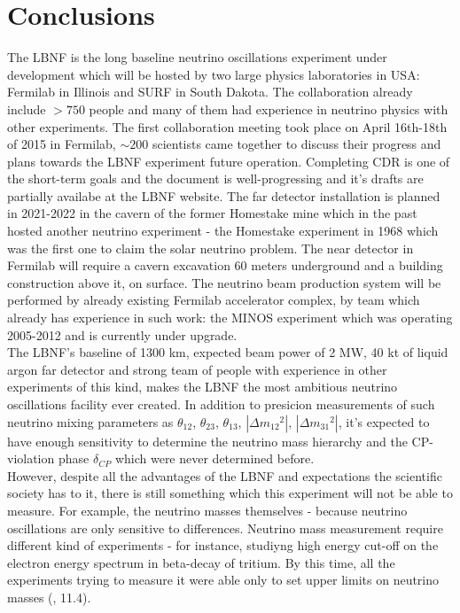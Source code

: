 \section{Conclusions}
The LBNF is the long baseline neutrino oscillations experiment under development which will be hosted by two large physics laboratories in USA: Fermilab in Illinois and SURF in South Dakota. The collaboration already include $>750$ people and many of them had experience in neutrino physics with other experiments. The first collaboration meeting took place on April 16th-18th of 2015 in Fermilab, $\sim 200$ scientists came together to discuss their progress and plans towards the LBNF experiment future operation. Completing CDR is one of the short-term goals and the document is well-progressing and it's drafts are partially availabe at the LBNF website. The far detector installation is planned in 2021-2022 in the cavern of the former Homestake mine which in the past hosted another neutrino experiment - the Homestake experiment in 1968 which was the first one to claim the solar neutrino problem. The near detector in Fermilab will require a cavern excavation 60 meters underground and a building construction above it, on surface. The neutrino beam production system will be performed by already existing Fermilab accelerator complex, by team which already has experience in such work: the MINOS experiment which was operating 2005-2012 and is currently under upgrade.    \\  

The LBNF's baseline of 1300 km, expected beam power of 2 MW, 40 kt of liquid argon far detector and strong team of people with experience in other experiments of this kind, makes the LBNF the most ambitious neutrino oscillations facility ever created. In addition to presicion measurements of such neutrino mixing parameters as $\theta_{12}$, $\theta_{23}$, $\theta_{13}$, $|\Delta{m_{12}}^2|$, $|\Delta{m_{31}}^2|$, it's expected to have enough sensitivity to determine the neutrino mass hierarchy and the CP-violation phase $\delta_{CP}$ which were never determined before.\\

However, despite all the advantages of the LBNF and expectations the scientific society has to it, there is still something which this experiment will not be able to measure. For example, the neutrino masses themselves - because neutrino oscillations are only sensitive to differences. Neutrino mass measurement require different kind of experiments - for instance, studiyng high energy cut-off on the electron energy spectrum in beta-decay of tritium. By this time, all the experiments trying to measure it were able only to set upper limits on neutrino masses (\cite{ref_Griffiths}, 11.4).  
